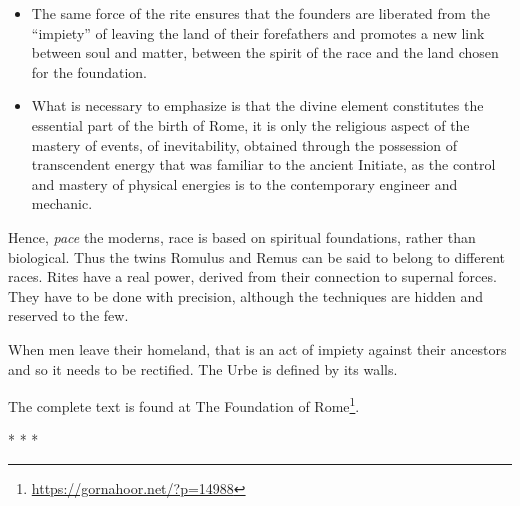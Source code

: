 \begin{itemize}
\item The same force of the rite ensures that the founders are liberated from the ``impiety'' of leaving the land of their forefathers and promotes a new link between soul and matter, between the spirit of the race and the land chosen for the foundation.

\item What is necessary to emphasize is that the divine element constitutes the essential part of the birth of Rome, it is only the religious aspect of the mastery of events, of inevitability, obtained through the possession of transcendent energy that was familiar to the ancient Initiate, as the control and mastery of physical energies is to the contemporary engineer and mechanic.
\end{itemize}


Hence, \emph{pace} the moderns, race is based on spiritual foundations, rather than biological. Thus the twins Romulus and Remus can be said to belong to different races. Rites have a real power, derived from their connection to supernal forces. They have to be done with precision, although the techniques are hidden and reserved to the few.

When men leave their homeland, that is an act of impiety against their ancestors and so it needs to be rectified. The Urbe is defined by its walls.

The complete text is found at The Foundation of Rome\footnote{\url{https://gornahoor.net/?p=14988}}.



\begin{center}* * *\end{center}

